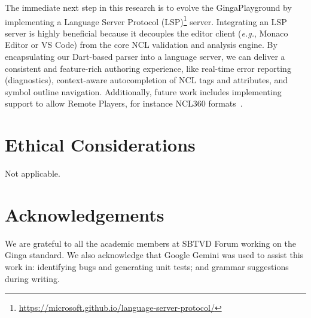 \documentclass[sigconf,authorversion,review,authordraft]{webmedia}
\begin{document}
The immediate next step in this research is to evolve the GingaPlayground by implementing a Language Server Protocol (LSP)\footnote{\url{https://microsoft.github.io/language-server-protocol/}} server. Integrating an LSP server is highly beneficial because it decouples the editor client (\textit{e.g.}, Monaco Editor or VS Code) from the core NCL validation and analysis engine. By encapsulating our Dart-based parser into a language server, we can deliver a consistent and feature-rich authoring experience, like real-time error reporting (diagnostics), context-aware autocompletion of NCL tags and attributes, and symbol outline navigation. Additionally, future work includes implementing support to allow Remote Players, for instance NCL360 formats~\cite{souza2020ncl360}.

\vspace{-0.3em}
\section*{Ethical Considerations}
\vspace{-0.3em}
Not applicable.

\vspace{-0.5em}
\section*{Acknowledgements}
\vspace{-0.3em}
We are grateful to all the academic members at SBTVD Forum working on the Ginga standard. We also acknowledge that Google Gemini was used to assist this work in: identifying bugs and generating unit tests; and grammar suggestions during writing.



\end{document}
